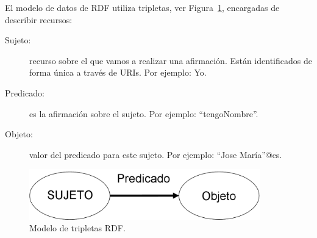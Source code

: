 El modelo de datos de RDF utiliza tripletas, ver Figura~\ref{fig:rdf-model}, encargadas de describir recursos:
\begin{description}
\item[Sujeto:] recurso sobre el que vamos a realizar una afirmación. Están
identificados de forma única a través de URIs. Por ejemplo: Yo.
\item[Predicado:] es la afirmación sobre el sujeto. Por ejemplo: ``tengoNombre''.
\item[Objeto:] valor del predicado para este sujeto. Por ejemplo: ``Jose
María''@es.
\end{description}

\begin{figure}[!htbp]
\centering
	\includegraphics[width=10cm]{images/rdf-model}
\caption{Modelo de tripletas RDF.}
\label{fig:rdf-model}
\end{figure}

